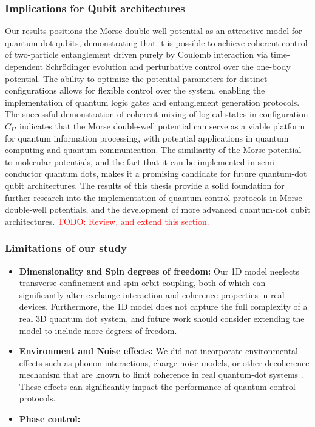 \documentclass{subfiles}
\begin{document}
\subsubsection*{Implications for Qubit architectures}
Our results positions the Morse double-well potential as an attractive model for quantum-dot qubits, demonstrating that it is possible to achieve coherent control of two-particle entanglement driven purely by Coulomb interaction via time-dependent Schrödinger evolution and perturbative control over the one-body potential. The ability to optimize the potential parameters for distinct configurations allows for flexible control over the system, enabling the implementation of quantum logic gates and entanglement generation protocols. The successful demonstration of coherent mixing of logical states in configuration $C_{II}$ indicates that the Morse double-well potential can serve as a viable platform for quantum information processing, with potential applications in quantum computing and quantum communication. The similiarity of the Morse potential to molecular potentials, and the fact that it can be implemented in semi-conductor quantum dots, makes it a promising candidate for future quantum-dot qubit architectures. The results of this thesis provide a solid foundation for further research into the implementation of quantum control protocols in Morse double-well potentials, and the development of more advanced quantum-dot qubit architectures. \textcolor{red}{TODO: Review, and extend this section.}

\subsubsection*{Limitations of our study}
\begin{itemize}
    \item \textbf{Dimensionality and Spin degrees of freedom:} Our 1D model neglects transverse confinement and spin-orbit coupling, both of which can significantly alter exchange interaction and coherence properties in real devices. Furthermore, the 1D model does not capture the full complexity of a real 3D quantum dot system, and future work should consider extending the model to include more degrees of freedom.
    \item \textbf{Environment and Noise effects:} We did not incorporate environmental effects such as phonon interactions, charge-noise models, or other decoherence mechanism that are known to limit coherence in real quantum-dot systems \cite{}. These effects can significantly impact the performance of quantum control protocols.
    \item \textbf{Phase control:}
\end{itemize}
\end{document}
